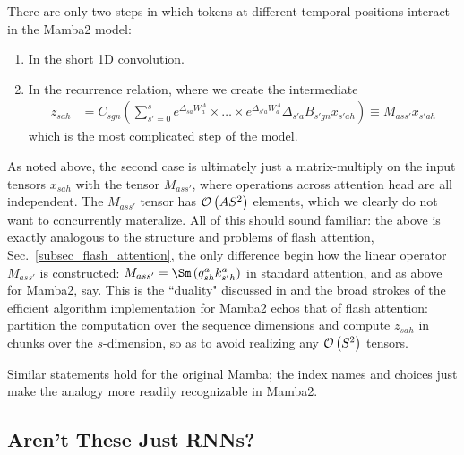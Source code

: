 There are only two steps in which tokens at different temporal positions interact in the Mamba2
model:
\begin{enumerate}
    \item In the short 1D convolution.
    \item In the recurrence relation, where we create the intermediate
        \begin{align}
        z _{ sah } &= C _{ sgn }\left (\sum _{ s'=0 }^{ s }e^{ \Delta _{ sa }W^{A} _{ a } }\times \ldots \times e^{ \Delta _{ s'a }W^{A} _{ a } } \Delta _{ s'a }B _{ s'gn } x _{ s'ah }\right ) \equiv  M  _{ ass' }x _{ s'ah }
        \end{align}
        which is the most complicated step of the model.
\end{enumerate}

As noted above, the second case is ultimately just a matrix-multiply on the input tensors $ x _{ sah
} $ with the tensor $ M _{ ass' } $, where operations across attention head are all independent. The
$ M _{ ass' } $ tensor has $ \mathcal{O} \left( A S ^{ 2 } \right)  $ elements, which we clearly do not want
to concurrently materalize. All of this should sound familiar: the above is exactly analogous to the
structure and problems of flash attention, Sec.~\ref{subsec_flash_attention}, the only difference begin how the linear operator $ M _{
ass' } $ is constructed: $ M _{ ass' } = \Sm \left (q ^{ a }_{ sh }k ^{ a }_{ s'h } \right ) $
in standard attention, and as above for Mamba2, say. This is the ``duality" discussed in
\cite{dao2024transformersssmsgeneralizedmodels} and the broad strokes of the efficient algorithm
implementation for Mamba2 echos that of flash attention: partition the computation over the sequence
dimensions and compute $ z _{ sah } $ in chunks over the $ s $-dimension, so as to avoid realizing
any $ \mathcal{O} \left( S ^{ 2 } \right)  $ tensors.

Similar statements hold for the original Mamba; the index names and choices just make the analogy
more readily recognizable in Mamba2.

\subsection{Aren't These Just RNNs?\label{subsec_rnns_and_ssm}}

